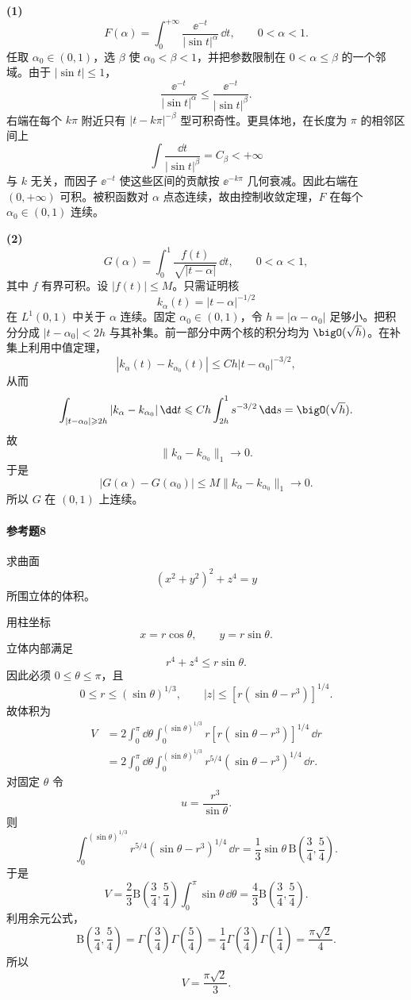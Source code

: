 \begin{xsolution}
\textbf{(1)}
\[
F(\alpha)=\int_0^{+\infty}\frac{\ee^{-t}}{|\sin t|^\alpha}\,\dd t,
\qquad0<\alpha<1.
\]
任取 $\alpha_0\in(0,1)$，选 $\beta$ 使 $\alpha_0<\beta<1$，并把参数限制在 $0<\alpha\leqslant\beta$ 的一个邻域。由于 $|\sin t|\leqslant1$，
\[
\frac{\ee^{-t}}{|\sin t|^\alpha}
\leqslant\frac{\ee^{-t}}{|\sin t|^\beta}.
\]
右端在每个 $k\pi$ 附近只有 $|t-k\pi|^{-\beta}$ 型可积奇性。更具体地，在长度为 $\pi$ 的相邻区间上
\[
\int\frac{\dd t}{|\sin t|^\beta}=C_\beta<+\infty
\]
与 $k$ 无关，而因子 $\ee^{-t}$ 使这些区间的贡献按 $\ee^{-k\pi}$ 几何衰减。因此右端在 $(0,+\infty)$ 可积。被积函数对 $\alpha$ 点态连续，故由控制收敛定理，$F$ 在每个 $\alpha_0\in(0,1)$ 连续。

\textbf{(2)}
\[
G(\alpha)=\int_0^1\frac{f(t)}{\sqrt{|t-\alpha|}}\,\dd t,
\qquad0<\alpha<1,
\]
其中 $f$ 有界可积。设 $|f(t)|\leqslant M$。只需证明核
\[
k_\alpha(t)=|t-\alpha|^{-1/2}
\]
在 $L^1(0,1)$ 中关于 $\alpha$ 连续。固定 $\alpha_0\in(0,1)$，令 $h=|\alpha-\alpha_0|$ 足够小。把积分分成
$|t-\alpha_0|<2h$ 与其补集。前一部分中两个核的积分均为 $\bigO(\sqrt h)$。在补集上利用中值定理，
\[
|k_\alpha(t)-k_{\alpha_0}(t)|
\leqslant C h|t-\alpha_0|^{-3/2},
\]
从而
\[
\int_{|t-\alpha_0|\geqslant2h}
|k_\alpha-k_{\alpha_0}|\,\dd t
\leqslant Ch\int_{2h}^1s^{-3/2}\,\dd s
=\bigO(\sqrt h).
\]
故
\[
\|k_\alpha-k_{\alpha_0}\|_1\to0.
\]
于是
\[
|G(\alpha)-G(\alpha_0)|
\leqslant M\|k_\alpha-k_{\alpha_0}\|_1\to0.
\]
所以 $G$ 在 $(0,1)$ 上连续。
\end{xsolution}

\paragraph{参考题8}
求曲面
\[
(x^2+y^2)^2+z^4=y
\]
所围立体的体积。

\begin{xsolution}
用柱坐标
\[
x=r\cos\theta,\qquad y=r\sin\theta.
\]
立体内部满足
\[
r^4+z^4\leqslant r\sin\theta.
\]
因此必须 $0\leqslant\theta\leqslant\pi$，且
\[
0\leqslant r\leqslant(\sin\theta)^{1/3},
\qquad
|z|\leqslant[r(\sin\theta-r^3)]^{1/4}.
\]
故体积为
\[
\begin{aligned}
V
&=2\int_0^\pi\dd\theta
\int_0^{(\sin\theta)^{1/3}}
r[r(\sin\theta-r^3)]^{1/4}\,\dd r\\
&=2\int_0^\pi\dd\theta
\int_0^{(\sin\theta)^{1/3}}
r^{5/4}(\sin\theta-r^3)^{1/4}\,\dd r.
\end{aligned}
\]
对固定 $\theta$ 令
\[
u=\frac{r^3}{\sin\theta}.
\]
则
\[
\int_0^{(\sin\theta)^{1/3}}
r^{5/4}(\sin\theta-r^3)^{1/4}\,\dd r
=\frac13\sin\theta\,
\mathrm{B}\left(\frac34,\frac54\right).
\]
于是
\[
V=\frac23\mathrm{B}\left(\frac34,\frac54\right)
\int_0^\pi\sin\theta\,\dd\theta
=\frac43\mathrm{B}\left(\frac34,\frac54\right).
\]
利用余元公式，
\[
\mathrm{B}\left(\frac34,\frac54\right)
=\Gamma\left(\frac34\right)\Gamma\left(\frac54\right)
=\frac14\Gamma\left(\frac34\right)\Gamma\left(\frac14\right)
=\frac{\pi\sqrt2}{4}.
\]
所以
\[
\boxed{V=\frac{\pi\sqrt2}{3}}.
\]
\end{xsolution}

